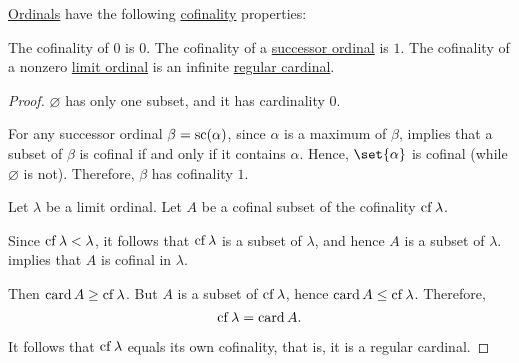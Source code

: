 \begin{proposition}\label{thm:ordinal_cofinality}
  \hyperref[def:ordinal]{Ordinals} have the following \hyperref[def:cofinality]{cofinality} properties:
  \begin{thmenum}
     The cofinality of \( 0 \) is \( 0 \).
     The cofinality of a \hyperref[def:successor_and_limit_ordinal]{successor ordinal} is \( 1 \).
     The cofinality of a nonzero \hyperref[def:successor_and_limit_ordinal]{limit ordinal} is an infinite \hyperref[def:regular_cardinal]{regular cardinal}.
  \end{thmenum}
\end{proposition}
\begin{proof}
   \( \varnothing \) has only one subset, and it has cardinality \( 0 \).

   For any successor ordinal \( \beta = \op{sc}(\alpha) \), since \( \alpha \) is a maximum of \( \beta \),  implies that a subset of \( \beta \) is cofinal if and only if it contains \( \alpha \). Hence, \( \set{ \alpha } \) is cofinal (while \( \varnothing \) is not). Therefore, \( \beta \) has cofinality \( 1 \).

   Let \( \lambda \) be a limit ordinal. Let \( A \) be a cofinal subset of the cofinality \( \op{cf} \lambda \).

  Since \( \op{cf} \lambda < \lambda \), it follows that \( \op{cf} \lambda \) is a subset of \( \lambda \), and hence \( A \) is a subset of \( \lambda \).  implies that \( A \) is cofinal in \( \lambda \).

  Then \( \card A \geq \op{cf} \lambda \). But \( A \) is a subset of \( \op{cf} \lambda \), hence \( \card A \leq \op{cf} \lambda \). Therefore,
  \begin{equation*}
    \op{cf} \lambda = \card A.
  \end{equation*}

  It follows that \( \op{cf} \lambda \) equals its own cofinality, that is, it is a regular cardinal.
\end{proof}

